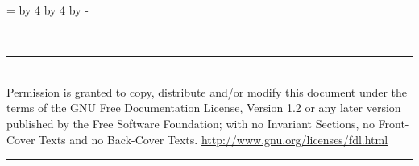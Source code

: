 \documentclass[8pt,pagesize,twoside,footexclude,headexclude]{scrartcl}
\begin{document}
\clearpage
\pagestyle{empty}
\newcount\currentpage 
\currentpage=\value{page} 
\divide\currentpage by 4  
\multiply\currentpage by 4  
\advance\currentpage by -\value{page}
%
\begin{titlepage}
  \begin{center}
    \renewcommand{\rmdefault}{ptm} %
    \vspace*{20pt}
    \vfill
    \begin{minipage}{\titlepagewidth}
      \begin{center}
        \rmfamily\mdseries\itshape\fontsize{300}{0}\selectfont
        \\
      \end{center}
    \end{minipage}
    \vfill
    \vspace*{43mm}%
    \begin{minipage}{\titlepagewidth}
      \hrule
      \vspace{1.5mm}
      \rmfamily\small
      \\[1.5mm] 
      Permission is granted to copy, distribute and/or modify this
      document under the terms of the GNU Free Documentation License,
      Version 1.2 or any later version published by the Free Software
      Foundation; with no Invariant Sections, no Front-Cover Texts and
      no Back-Cover Texts.\hfill
      \href{http://www.gnu.org/licenses/fdl.html}{http://www.gnu.org/licenses/fdl.html}\\
      \vspace{-1mm}
      \hrule
    \end{minipage}
  \end{center}
\end{titlepage}
\end{document}
